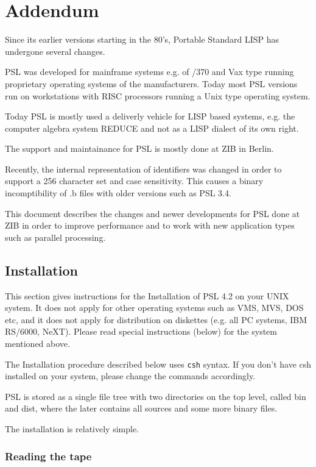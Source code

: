 \chapter{Addendum}

Since its earlier versions starting in the 80's, Portable Standard LISP 
has undergone several changes. 

PSL was developed for mainframe systems
e.g. of /370 and Vax type running proprietary operating systems of the  
manufacturers. Today most PSL versions run on workstations with RISC processors
running a Unix type operating system. 

Today PSL is mostly used a deliverly vehicle for LISP based systems, e.g.
the computer algebra system REDUCE and not as a LISP dialect of its own 
right.

The support and maintainance for PSL is mostly done at ZIB in Berlin.

Recently, the internal representation of identifiers was changed in order
to support a 256 character set and case sensitivity. This causes a
binary incomptibility of .b files with older versions such as PSL 3.4.

This document describes the changes and newer developments for PSL
done at ZIB in order to improve performance and to work with new
application types such as parallel processing.

\section{Installation}

This section gives instructions for the Installation of PSL 4.2 on
your UNIX system. It does not apply for other operating systems such
as VMS, MVS, DOS etc, and it does not apply for distribution on
diskettes (e.g. all PC systems, IBM RS/6000, NeXT). Please read
special instructions (below) for the system mentioned above.

The Installation procedure described below uses {\tt csh} syntax.
If you don't have csh installed on your system, please change the
commands accordingly.

PSL is stored as a single file tree with two directories on the
top level, called bin and dist, where the later contains all sources
and some more binary files.

The installation is relatively simple.

\subsection{Reading the tape}

